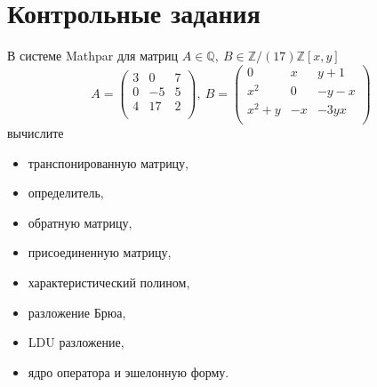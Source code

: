 \section{Контрольные задания}
В системе Mathpar для матриц $A\in \mathbb{Q}, \ B\in \mathbb{Z}/(17)\mathbb{Z}[x, y] $ $$A =\left(\begin{array}{ccc}3&0 &7\\ 0 &-5&5\\4&17&2\\ \end{array}\right), \ 
B =\left(\begin{array}{ccc}0 &x&y+1\\ x^2&0 &-y-x \\ x^2+y&-x &-3yx\\ \end{array}\right)$$ вычислите 
\begin{itemize}
 \item транспонированную матрицу, 
 \item определитель, 
 \item обратную матрицу, 
 \item присоединенную матрицу, 
 \item характеристический полином, 
 \item разложение Брюа, 
 \item LDU разложение, 
 \item ядро оператора и эшелонную форму. 
 \end{itemize}
